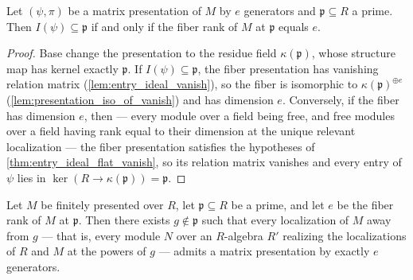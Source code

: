 \begin{theorem}
  \label{thm:entry_ideal_prime_iff}
  \leanok
  Let \((\psi, \pi)\) be a matrix presentation of \(M\) by \(e\) generators
  and \(\mathfrak p \subseteq R\) a prime.  Then
  \(I(\psi) \subseteq \mathfrak p\) if and only if the fiber rank of \(M\)
  at \(\mathfrak p\) equals \(e\).
\end{theorem}

\begin{proof}
  \leanok
  Base change the presentation to the residue field
  \(\kappa(\mathfrak p)\), whose structure map has kernel exactly
  \(\mathfrak p\).  If \(I(\psi) \subseteq \mathfrak p\), the fiber
  presentation has vanishing relation matrix
  (\cref{lem:entry_ideal_vanish}), so the fiber is isomorphic to
  \(\kappa(\mathfrak p)^{\oplus e}\)
  (\cref{lem:presentation_iso_of_vanish}) and has dimension \(e\).
  Conversely, if the fiber has dimension \(e\), then --- every module over
  a field being free, and free modules over a field having rank equal to
  their dimension at the unique relevant localization --- the fiber
  presentation satisfies the hypotheses of
  \cref{thm:entry_ideal_flat_vanish}, so its relation matrix vanishes and
  every entry of \(\psi\) lies in
  \(\ker(R \to \kappa(\mathfrak p)) = \mathfrak p\).
\end{proof}

\begin{theorem}
  \label{thm:nakayama_prolongation}
  \leanok
  Let \(M\) be finitely presented over \(R\), let \(\mathfrak p \subseteq R\)
  be a prime, and let \(e\) be the fiber rank of \(M\) at \(\mathfrak p\).
  Then there exists \(g \notin \mathfrak p\) such that every localization of
  \(M\) away from \(g\) --- that is, every module \(N\) over an \(R\)-algebra
  \(R'\) realizing the localizations of \(R\) and \(M\) at the powers of
  \(g\) --- admits a matrix presentation by exactly \(e\) generators.
\end{theorem}


